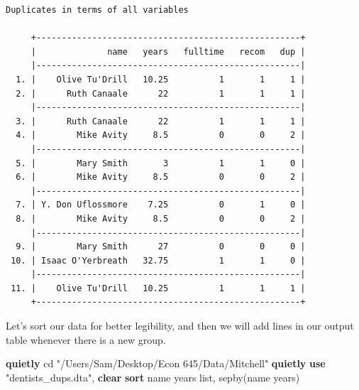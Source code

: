 \documentclass[
]{book}
\newenvironment{Shaded}{\begin{snugshade}}{\end{snugshade}}
\newcommand{\BaseNTok}[1]{\textcolor[rgb]{0.00,0.00,0.81}{#1}}
\newcommand{\KeywordTok}[1]{\textcolor[rgb]{0.13,0.29,0.53}{\textbf{#1}}}
\newcommand{\NormalTok}[1]{#1}
\newcommand{\OtherTok}[1]{\textcolor[rgb]{0.56,0.35,0.01}{#1}}
\newcommand{\StringTok}[1]{\textcolor[rgb]{0.31,0.60,0.02}{#1}}
\begin{document}
\begin{verbatim}
Duplicates in terms of all variables

     +----------------------------------------------------+
     |              name   years   fulltime   recom   dup |
     |----------------------------------------------------|
  1. |    Olive Tu'Drill   10.25          1       1     1 |
  2. |      Ruth Canaale      22          1       1     1 |
     |----------------------------------------------------|
  3. |      Ruth Canaale      22          1       1     1 |
  4. |        Mike Avity     8.5          0       0     2 |
     |----------------------------------------------------|
  5. |        Mary Smith       3          1       1     0 |
  6. |        Mike Avity     8.5          0       0     2 |
     |----------------------------------------------------|
  7. | Y. Don Uflossmore    7.25          0       1     0 |
  8. |        Mike Avity     8.5          0       0     2 |
     |----------------------------------------------------|
  9. |        Mary Smith      27          0       0     0 |
 10. | Isaac O'Yerbreath   32.75          1       1     0 |
     |----------------------------------------------------|
 11. |    Olive Tu'Drill   10.25          1       1     1 |
     +----------------------------------------------------+
\end{verbatim}

Let's sort our data for better legibility, and then we will add lines in our output table whenever there is a new group.

\begin{Shaded}
\begin{Highlighting}[]
\KeywordTok{quietly}\NormalTok{ cd }\StringTok{"/Users/Sam/Desktop/Econ 645/Data/Mitchell"}
\KeywordTok{quietly} \KeywordTok{use} \StringTok{"dentists\_dups.dta"}\NormalTok{, }\KeywordTok{clear}
\KeywordTok{sort} \BaseNTok{name}\NormalTok{ years}
\OtherTok{list}\NormalTok{, sepby(}\BaseNTok{name}\NormalTok{ years)}
\end{Highlighting}
\end{Shaded}
\end{document}
